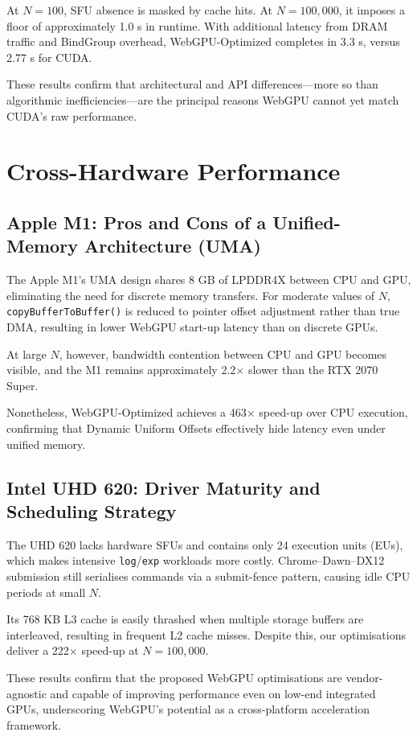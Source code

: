 \documentclass[PhD]{PHlab-thesis}
\begin{document}
At $N = 100$, SFU absence is masked by cache hits. At $N = 100,000$, it imposes a floor of approximately 1.0 s in runtime. With additional latency from DRAM traffic and BindGroup overhead, WebGPU-Optimized completes in 3.3 s, versus 2.77 s for CUDA.

These results confirm that architectural and API differences—more so than algorithmic inefficiencies—are the principal reasons WebGPU cannot yet match CUDA's raw performance.

\section{Cross-Hardware Performance}
\subsection{Apple M1: Pros and Cons of a Unified-Memory Architecture (UMA)}
The Apple M1's UMA design shares 8 GB of LPDDR4X between CPU and GPU, eliminating the need for discrete memory transfers. For moderate values of $N$, \texttt{copyBufferToBuffer()} is reduced to pointer offset adjustment rather than true DMA, resulting in lower WebGPU start-up latency than on discrete GPUs.

At large $N$, however, bandwidth contention between CPU and GPU becomes visible, and the M1 remains approximately 2.2$\times$ slower than the RTX 2070 Super.

Nonetheless, WebGPU-Optimized achieves a 463$\times$ speed-up over CPU execution, confirming that Dynamic Uniform Offsets effectively hide latency even under unified memory.

\subsection{Intel UHD 620: Driver Maturity and Scheduling Strategy}
The UHD 620 lacks hardware SFUs and contains only 24 execution units (EUs), which makes intensive \texttt{log}/\texttt{exp} workloads more costly. Chrome–Dawn–DX12 submission still serialises commands via a submit-fence pattern, causing idle CPU periods at small $N$.

Its 768 KB L3 cache is easily thrashed when multiple storage buffers are interleaved, resulting in frequent L2 cache misses. Despite this, our optimisations deliver a 222$\times$ speed-up at $N = 100,000$.

These results confirm that the proposed WebGPU optimisations are vendor-agnostic and capable of improving performance even on low-end integrated GPUs, underscoring WebGPU's potential as a cross-platform acceleration framework.
\end{document}
